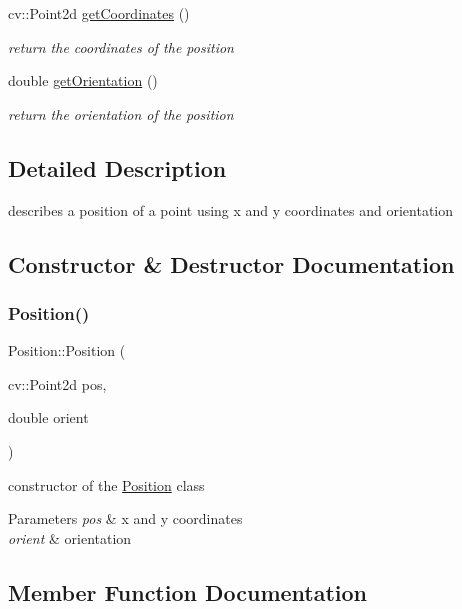 \begin{DoxyCompactItemize}
cv\+::\+Point2d \mbox{\hyperlink{class_position_a9de96881a3ea441b4cfb26339172dc6f}{get\+Coordinates}} ()
\begin{DoxyCompactList}\small\item\em return the coordinates of the position \end{DoxyCompactList}\item 
double \mbox{\hyperlink{class_position_af0b1158a379d54dd7ee08164eafe262e}{get\+Orientation}} ()
\begin{DoxyCompactList}\small\item\em return the orientation of the position \end{DoxyCompactList}\end{DoxyCompactItemize}


\subsection{Detailed Description}
describes a position of a point using x and y coordinates and orientation 

\subsection{Constructor \& Destructor Documentation}
\mbox{\label{class_position_adafef18a82e49bf4c91ff0a31b82ff05}} 
\subsubsection{\texorpdfstring{Position()}{Position()}}
{\footnotesize\ttfamily Position\+::\+Position (\begin{DoxyParamCaption}\item[{cv\+::\+Point2d}]{pos,  }\item[{double}]{orient }\end{DoxyParamCaption})}



constructor of the \mbox{\hyperlink{class_position}{Position}} class 


\begin{DoxyParams}{Parameters}
{\em pos} & x and y coordinates \\
\hline
{\em orient} & orientation \\
\hline
\end{DoxyParams}


\subsection{Member Function Documentation}
\mbox{\label{class_position_a9de96881a3ea441b4cfb26339172dc6f}} 

